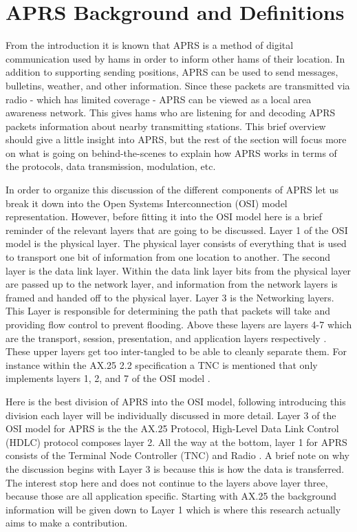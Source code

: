 \chapter{APRS Background and Definitions}
From the introduction it is known that APRS is a method of digital communication used by hams in order to inform other hams of their location. In addition to supporting sending positions, APRS can be used to send messages, bulletins, weather, and other information. Since these packets are transmitted via radio  - which has limited coverage - APRS can be viewed as a local area awareness network. This gives hams who are listening for and decoding APRS packets information about nearby transmitting stations. This brief overview should give a little insight into APRS, but the rest of the section will focus more on what is going on behind-the-scenes to explain how APRS works in terms of the protocols, data transmission, modulation, etc.

In order to organize this discussion of the different components of APRS let us break it down into the Open Systems Interconnection (OSI) model representation. However, before fitting it into the OSI model here is a brief reminder of the relevant layers that are going to be discussed. Layer 1 of the OSI model is the physical layer. The physical layer consists of everything that is used to transport one bit of information from one location to another. The second layer is the data link layer. Within the data link layer bits from the physical layer are passed up to the network layer, and information from the network layers is framed and handed off to the physical layer. Layer 3 is the Networking layers. This Layer is responsible for determining the path that packets will take and providing flow control to prevent flooding. Above these layers are layers 4-7 which are the transport, session, presentation, and application layers respectively \cite{Sosinsky2009}. These upper layers get too inter-tangled to be able to cleanly separate them. For instance within the AX.25 2.2 specification a TNC is mentioned that only implements layers 1, 2, and 7 of the OSI model \cite{Beech1998}.

Here is the best division of APRS into the OSI model, following introducing this division each layer will be individually discussed in more detail. Layer 3 of the OSI model for APRS is the the AX.25 Protocol,  High-Level Data Link Control (HDLC) protocol composes layer 2. All the way at the bottom, layer 1 for APRS consists of the Terminal Node Controller (TNC) and Radio \cite{Silver2013}. A brief note on why the discussion begins with Layer 3 is because this is how the data is transferred. The interest stop here and does not continue to the layers above layer three, because those are all application specific. Starting with AX.25 the background information will be given down to Layer 1 which is where this research actually aims to make a contribution.

